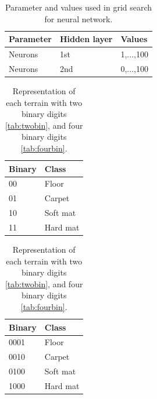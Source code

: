 \documentclass[USenglish]{ifimaster}  %
\begin{document}
\begin{table}[h]
	\centering
	\begin{tabular}{@{}lll@{}}
		\toprule
		\textbf{Parameter} & \textbf{Hidden layer} & \textbf{Values} \\ \midrule
		Neurons & 1st & 1,...,100 \\
		Neurons & 2nd & 0,...,100 \\ \bottomrule
	\end{tabular}
	\caption[Parameters and values used in grid search for neural network]{Parameter and values used in grid search for neural network.}
	\label{tab:hypnn}
\end{table}
\FloatBarrier

\begin{table}[h]
	\begin{subtable}[h]{0.5\textwidth}
		\centering
		\captionsetup{justification=centering}
		\begin{tabular}{@{}ll@{}}
		\toprule
		\textbf{Binary} & \textbf{Class} \\ \midrule
		00 & Floor \\
		01 & Carpet \\
		10 & Soft mat \\
		11 & Hard mat \\ \bottomrule
	\end{tabular}
		\caption{Representation of each terrain with two binary digits.}
		\label{tab:twobin}
	\end{subtable}
	\hfill
	\begin{subtable}[h]{0.5\textwidth}
		\centering
		\captionsetup{justification=centering}
	\begin{tabular}{@{}ll@{}}
	\toprule
	\textbf{Binary} & \textbf{Class} \\ \midrule
	0001 & Floor \\
	0010 & Carpet \\
	0100 & Soft mat \\
	1000 & Hard mat \\ \bottomrule
\end{tabular}
		\caption{Representation of each terrain with four binary digits.}
		\label{tab:fourbin}
	\end{subtable}
	\caption[Binary representations of terrain]{Representation of each terrain with two binary digits \ref{tab:twobin}, and four binary digits \ref{tab:fourbin}.}
	\label{tab:binary}
\end{table}
\FloatBarrier
\end{document}
